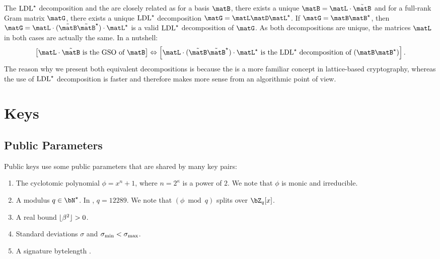 The $ \text{LDL}^\star $ decomposition and the \gso are closely related as for a basis $\matB$, there exists a unique \gso $\matB = \L \cdot \tBB$ and for a full-rank Gram matrix $\matG$, there exists a unique $ \text{LDL}^\star $ decomposition $\matG = \L  \matD  \adj\L$. If $\matG = \matB \adj \matB$, then $\matG = \L \cdot (\tBB \adj \tBB) \cdot \adj\L$ is a valid $ \text{LDL}^\star $ decomposition of $\matG$. As both decompositions are unique, the matrices $\L$ in both cases are actually the same. In a nutshell:
\begin{equation}
 \left[\L\cdot\tBB \text{ is the \gso of } \matB \right]
  \Leftrightarrow  \left[ \L \cdot (\tBB\adj \tBB) \cdot \adj\L  \text{ is the $\LDLs$ decomposition of }(\matB\adj \matB)\right].
\end{equation}
The reason why we present both equivalent decompositions is because the \gso is a more familiar concept in lattice-based cryptography, whereas the use of $ \text{LDL}^\star $ decomposition is faster and therefore makes more sense from an algorithmic point of view.

\section{Keys} \label{sec:spec:keys}

\subsection{Public Parameters}

Public keys use some public parameters that are shared by many key
pairs:
\begin{enumerate}
\item The cyclotomic polynomial $\phi = x^n+1$, where $n = 2^\kappa$ is a power of $2$. We note that $\phi$ is monic and irreducible.
\item A modulus $q \in \bN^\star$. In \falcon, $q = 12289$. We note that $(\phi \bmod q)$ splits over $\bZ_q[x]$.
\item A real bound $\lfloor \beta^2 \rfloor > 0$.
\item Standard deviations $\sigma$ and $\sigma_{\min} < \sigma_{\max}$.
\item A signature bytelength \sigbytelen.
\end{enumerate}
 
